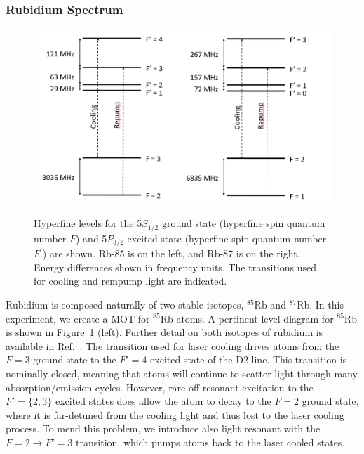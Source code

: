 \documentclass{../lab}
\begin{document}
\subsubsection{Rubidium Spectrum}
\label{subsubsec:RubidiumSpectrum}


\begin{figure}[h]
    \centering

    \href{http://experimentationlab.berkeley.edu/sites/default/files/images/400px-MOTimage005.png}{\includegraphics[height=2.5 in]{MOT/images/Rb_D2_levels.PNG}}
    \caption{Hyperfine levels for the 5$S_{1/2}$ ground state (hyperfine spin quantum number $F$) and 5$P_{3/2}$ excited state (hyperfine spin quantum number $F^\prime$) are shown.  Rb-85 is on the left, and Rb-87 is on the right. Energy differences shown in frequency units.  The transitions used for cooling and rempump light are indicated.}
    \label{fig:400px-MOTimage005}
\end{figure}



Rubidium is composed naturally of two stable isotopes, $^{85}$Rb and $^{87}$Rb. In this experiment, we create a MOT for $^{85}$Rb atoms. A pertinent level diagram for $^{85}$Rb is shown in Figure~\ref{fig:400px-MOTimage005} (left).  Further detail on both isotopes of rubidium is available in Ref.~\cite{Steck}. The transition used for laser cooling drives atoms from the $F = 3$ ground state to the $F' = 4$ excited state of the D2 line. This transition is nominally closed, meaning that atoms will continue to scatter light through many absorption/emission cycles. However, rare off-resonant excitation to the $F' = \{2,3\}$ excited states does allow the atom to decay to the $F = 2$ ground state, where it is far-detuned from the cooling light and thus lost to the laser cooling process. To mend this problem, we introduce also light resonant with the $F = 2 \rightarrow F' = 3$ transition, which pumps atoms back to the laser cooled states.
\end{document}
